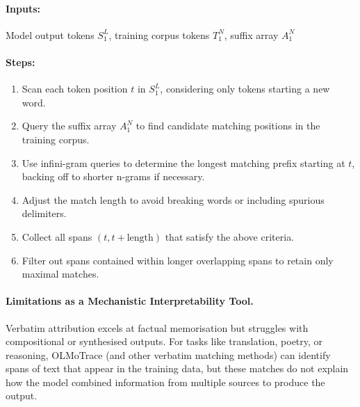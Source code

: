 \begin{definitionbox}
\label{def:olmotrace-algorithm}
\paragraph{Inputs:} Model output tokens $S_1^L$, training corpus tokens $T_1^N$, suffix array $A_1^N$\\

\paragraph{Steps:}
\begin{enumerate}
    \item Scan each token position $t$ in $S_1^L$, considering only tokens starting a new word.
    \item Query the suffix array $A_1^N$ to find candidate matching positions in the training corpus.
    \item Use infini-gram queries to determine the longest matching prefix starting at $t$, backing off to shorter n-grams if necessary.
    \item Adjust the match length to avoid breaking words or including spurious delimiters.
    \item Collect all spans $(t, t+\text{length})$ that satisfy the above criteria.
    \item Filter out spans contained within longer overlapping spans to retain only maximal matches.
\end{enumerate}
\end{definitionbox}

\paragraph{Limitations as a Mechanistic Interpretability Tool.}
Verbatim attribution excels at factual memorisation but struggles with compositional or synthesised outputs. For tasks like translation, poetry, or reasoning, OLMoTrace (and other verbatim matching methods) can identify spans of text that appear in the training data, but these matches do not explain how the model combined information from multiple sources to produce the output.

